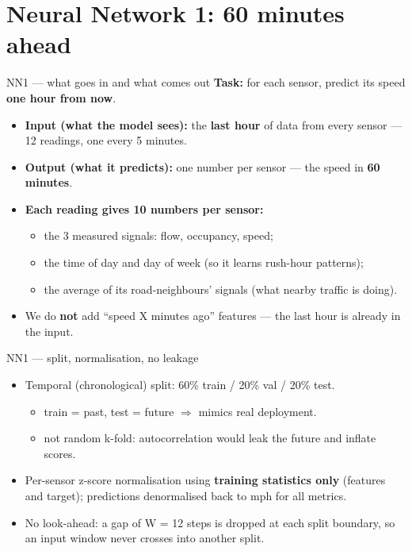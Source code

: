 \documentclass[aspectratio=169]{beamer}
\begin{document}
\section{Neural Network 1: 60 minutes ahead}
\begin{frame}{NN1 --- what goes in and what comes out}
  \textbf{Task:} for each sensor, predict its speed \textbf{one hour from now}.
  \begin{itemize}
    \item \textbf{Input (what the model sees):} the \textbf{last hour} of data from every sensor
          --- 12 readings, one every 5 minutes.
    \item \textbf{Output (what it predicts):} one number per sensor --- the speed in \textbf{60 minutes}.
    \item \textbf{Each reading gives 10 numbers per sensor:}
    \begin{itemize}
      \item the 3 measured signals: flow, occupancy, speed;
      \item the time of day and day of week (so it learns rush-hour patterns);
      \item the average of its road-neighbours' signals (what nearby traffic is doing).
    \end{itemize}
    \item We do \textbf{not} add ``speed X minutes ago'' features --- the last hour is already in the input.
  \end{itemize}
\end{frame}

\begin{frame}{NN1 --- split, normalisation, no leakage}
  \begin{itemize}
    \item Temporal (chronological) split: 60\% train / 20\% val / 20\% test.
    \begin{itemize}
      \item train = past, test = future $\Rightarrow$ mimics real deployment.
      \item not random k-fold: autocorrelation would leak the future and inflate scores.
    \end{itemize}
    \item Per-sensor z-score normalisation using \textbf{training statistics only}
    (features and target); predictions denormalised back to mph for all metrics.
    \item No look-ahead: a gap of W = 12 steps is dropped at each split boundary, so an input window never crosses into another split.
  \end{itemize}
\end{frame}
\end{document}
